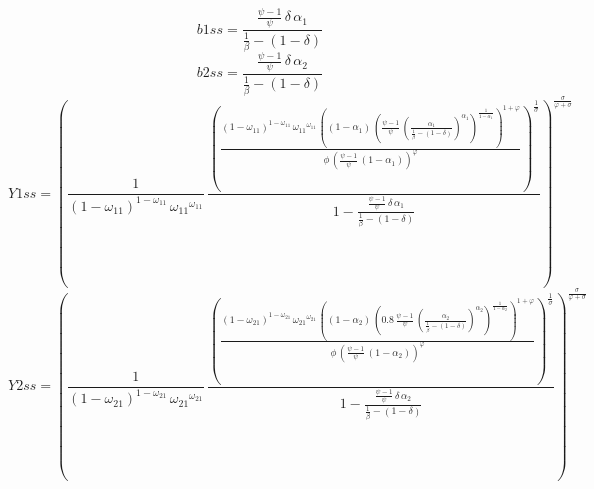 \begin{dmath*}
b1ss = \frac{\frac{{{\psi}}-1}{{{\psi}}}\, {{\delta}}\, {{\alpha_{1}}}}{\frac{1}{{{\beta}}}-\left(1-{{\delta}}\right)}
\end{dmath*}
\begin{dmath*}
b2ss = \frac{\frac{{{\psi}}-1}{{{\psi}}}\, {{\delta}}\, {{\alpha_{2}}}}{\frac{1}{{{\beta}}}-\left(1-{{\delta}}\right)}
\end{dmath*}
\begin{dmath*}
Y1ss = \left(\frac{1}{\left(1-{{\omega_{11}}}\right)^{1-{{\omega_{11}}}}\, {{\omega_{11}}}^{{{\omega_{11}}}}}\, \frac{\left(\frac{\left(1-{{\omega_{11}}}\right)^{1-{{\omega_{11}}}}\, {{\omega_{11}}}^{{{\omega_{11}}}}\, \left(\left(1-{{\alpha_{1}}}\right)\, \left(\frac{{{\psi}}-1}{{{\psi}}}\, \left(\frac{{{\alpha_{1}}}}{\frac{1}{{{\beta}}}-\left(1-{{\delta}}\right)}\right)^{{{\alpha_{1}}}}\right)^{\frac{1}{1-{{\alpha_{1}}}}}\right)^{1+{{\varphi}}}}{{{\phi}}\, \left(\frac{{{\psi}}-1}{{{\psi}}}\, \left(1-{{\alpha_{1}}}\right)\right)^{{{\varphi}}}}\right)^{\frac{1}{{{\sigma}}}}}{1-\frac{\frac{{{\psi}}-1}{{{\psi}}}\, {{\delta}}\, {{\alpha_{1}}}}{\frac{1}{{{\beta}}}-\left(1-{{\delta}}\right)}}\right)^{\frac{{{\sigma}}}{{{\varphi}}+{{\sigma}}}}
\end{dmath*}
\begin{dmath*}
Y2ss = \left(\frac{1}{\left(1-{{\omega_{21}}}\right)^{1-{{\omega_{21}}}}\, {{\omega_{21}}}^{{{\omega_{21}}}}}\, \frac{\left(\frac{\left(1-{{\omega_{21}}}\right)^{1-{{\omega_{21}}}}\, {{\omega_{21}}}^{{{\omega_{21}}}}\, \left(\left(1-{{\alpha_{2}}}\right)\, \left(0.8\, \frac{{{\psi}}-1}{{{\psi}}}\, \left(\frac{{{\alpha_{2}}}}{\frac{1}{{{\beta}}}-\left(1-{{\delta}}\right)}\right)^{{{\alpha_{2}}}}\right)^{\frac{1}{1-{{\alpha_{2}}}}}\right)^{1+{{\varphi}}}}{{{\phi}}\, \left(\frac{{{\psi}}-1}{{{\psi}}}\, \left(1-{{\alpha_{2}}}\right)\right)^{{{\varphi}}}}\right)^{\frac{1}{{{\sigma}}}}}{1-\frac{\frac{{{\psi}}-1}{{{\psi}}}\, {{\delta}}\, {{\alpha_{2}}}}{\frac{1}{{{\beta}}}-\left(1-{{\delta}}\right)}}\right)^{\frac{{{\sigma}}}{{{\varphi}}+{{\sigma}}}}
\end{dmath*}

